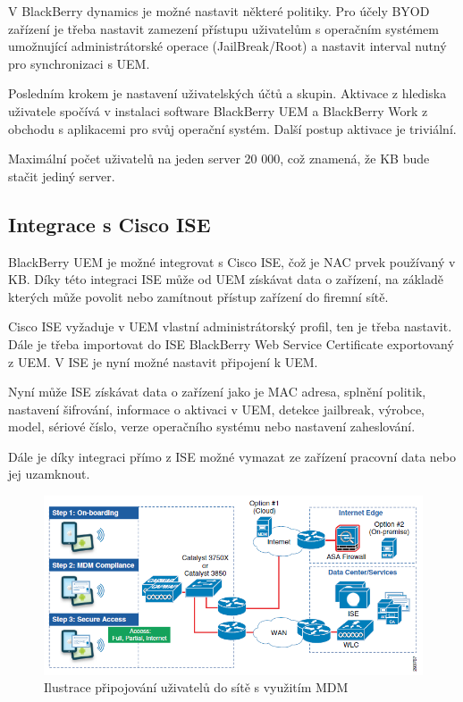 V BlackBerry dynamics je možné nastavit některé politiky. Pro účely BYOD zařízení je třeba nastavit zamezení přístupu uživatelům s operačním systémem umožnující administrátorské operace (JailBreak/Root) a nastavit interval nutný pro synchronizaci s UEM.

Posledním krokem je nastavení uživatelských účtů a skupin. Aktivace z hlediska uživatele spočívá v instalaci software BlackBerry UEM a BlackBerry Work z obchodu s aplikacemi pro svůj operační systém. Další postup aktivace je triviální.

Maximální počet uživatelů na jeden server 20 000, což znamená, že KB bude stačit jediný server. 

\subsection{Integrace s Cisco ISE}


BlackBerry UEM je možné integrovat s Cisco ISE, čož je NAC prvek používaný v KB. Díky této integraci ISE může od UEM získávat data o zařízení, na základě kterých může povolit nebo zamítnout přístup zařízení do firemní sítě.

Cisco ISE vyžaduje v UEM vlastní administrátorský profil, ten je třeba nastavit. Dále je třeba importovat do ISE BlackBerry Web Service Certificate exportovaný z UEM. V ISE je nyní možné nastavit připojení k UEM. 

Nyní může ISE získávat data o zařízení jako je MAC adresa, splnění politik, nastavení šifrování, informace o aktivaci v UEM, detekce jailbreak, výrobce, model, sériové číslo, verze operačního systému nebo nastavení zaheslování.

Dále je díky integraci přímo z ISE možné vymazat ze zařízení pracovní data nebo jej uzamknout.

\begin{figure}[h!]
\centering
\includegraphics[width=13cm]{img/CiscoMDM}
\caption{Ilustrace připojování uživatelů do sítě s využitím MDM}\label{CiscoMDM}
\end{figure} 

